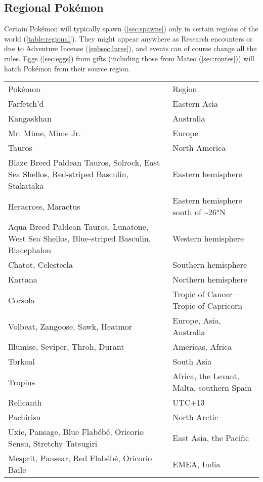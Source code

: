 \subsection{Regional Pokémon\label{subsec:regional}}
Certain Pokémon will typically spawn (\autoref{sec:spawns}) only in certain regions of the world (\autoref{table:regional}).
They might appear anywhere as Research encounters or due to Adventure Incense (\autoref{subsec:lures}),
 and events can of course change all the rules.
Eggs (\autoref{sec:eggs}) from gifts (including those from Mateo (\autoref{sec:routes})) will
 hatch Pokémon from their source region.
\begin{table}
\centering
\footnotesize
  \begin{tabular}{p{}l}
Pokémon & Region \\
\Midrule
Farfetch'd & Eastern Asia\\
\rowcolor{Gray!25}
Kangaskhan & Australia\\
Mr. Mime, Mime Jr. & Europe\\
\rowcolor{Gray!25}
Tauros & North America\\
Blaze Breed Paldean Tauros, Solrock, East Sea Shellos, Red-striped Basculin, Stakataka & Eastern hemisphere\\
\rowcolor{Gray!25}
Heracross, Maractus & Eastern hemisphere south of \textasciitilde\ang{26}N\\
Aqua Breed Paldean Tauros, Lunatone, West Sea Shellos, Blue-striped Basculin, Blacephalon & Western hemisphere\\
\rowcolor{Gray!25}
Chatot, Celesteela & Southern hemisphere\\
Kartana & Northern hemisphere\\
\rowcolor{Gray!25}
Corsola & Tropic of Cancer---Tropic of Capricorn\\
Volbeat, Zangoose, Sawk, Heatmor & Europe, Asia, Australia\\
\rowcolor{Gray!25}
Illumise, Seviper, Throh, Durant & Americas, Africa\\
Torkoal & South Asia\\
\rowcolor{Gray!25}
Tropius & Africa, the Levant, Malta, southern Spain\\
Relicanth & UTC+13\\
\rowcolor{Gray!25}
Pachirisu & North Arctic\\
Uxie, Pansage, Blue Flabébé, Oricorio Sensu, Stretchy Tatsugiri & East Asia, the Pacific\\
\rowcolor{Gray!25}
Mesprit, Pansear, Red Flabébé, Oricorio Baile & EMEA, India\\

\end{tabular}
\end{table}
